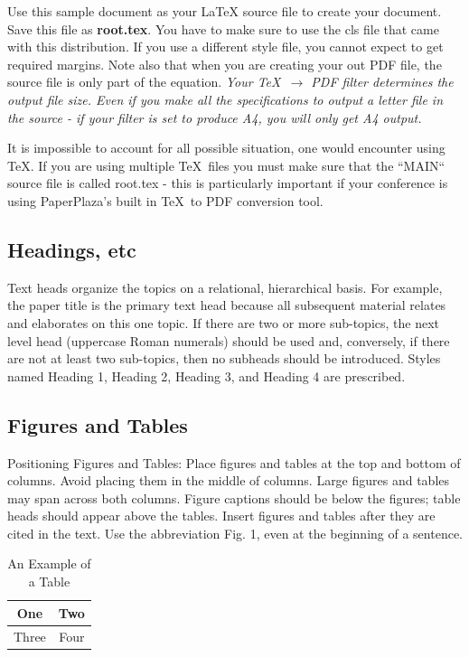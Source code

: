 \documentclass[letterpaper, 10 pt, conference]{ieeeconf}  %
\begin{document}
	Use this sample document as your LaTeX source file to create your document. Save this file as {\bf root.tex}. You have to make sure to use the cls file that came with this distribution. If you use a different style file, you cannot expect to get required margins. Note also that when you are creating your out PDF file, the source file is only part of the equation. {\it Your \TeX\ $\rightarrow$ PDF filter determines the output file size. Even if you make all the specifications to output a letter file in the source - if your filter is set to produce A4, you will only get A4 output. }
	
	It is impossible to account for all possible situation, one would encounter using \TeX. If you are using multiple \TeX\ files you must make sure that the ``MAIN`` source file is called root.tex - this is particularly important if your conference is using PaperPlaza's built in \TeX\ to PDF conversion tool.
	
	\subsection{Headings, etc}
	
	Text heads organize the topics on a relational, hierarchical basis. For example, the paper title is the primary text head because all subsequent material relates and elaborates on this one topic. If there are two or more sub-topics, the next level head (uppercase Roman numerals) should be used and, conversely, if there are not at least two sub-topics, then no subheads should be introduced. Styles named Heading 1, Heading 2, Heading 3, and Heading 4 are prescribed.
	
	\subsection{Figures and Tables}
	
	Positioning Figures and Tables: Place figures and tables at the top and bottom of columns. Avoid placing them in the middle of columns. Large figures and tables may span across both columns. Figure captions should be below the figures; table heads should appear above the tables. Insert figures and tables after they are cited in the text. Use the abbreviation Fig. 1, even at the beginning of a sentence.
	
	\begin{table}[h]
		\caption{An Example of a Table}
		\label{table_example}
		\begin{center}
			\begin{tabular}{|c||c|}
				\hline
				One & Two\\
				\hline
				Three & Four\\
				\hline
			\end{tabular}
		\end{center}
	\end{table}
	
\end{document}
